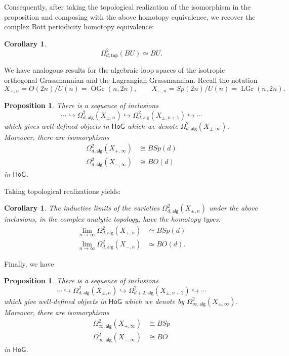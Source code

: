 \message{ !name(Bryan-Vakil.tex)}\documentclass{amsart}
\newtheorem{proposition}[theorem]{Proposition}
\newtheorem{corollary}[theorem]{Corollary}
\theoremstyle{definition}
\newcommand{\HoG}{\textsf{HoG}}
\newcommand{\alg}{\mathsf{alg}}
\renewcommand{\top}{\mathsf{top}}
\newcommand{\LGr}{\operatorname{LGr}}
\newcommand{\OGr}{\operatorname{OGr}}
\newcommand{\LoopTwo}{\Omega^{2}_{d,\alg}}
\newcommand{\LoopTwoTop}{\Omega^{2}_{d,\top}}
\newcommand{\homotopyeq}{\simeq}
\begin{document}
Consequently, after taking the topological realization of the
isomorphism in the proposition and composing with the above homotopy
equivalence, we recover the complex Bott periodicity homotopy
equivalence:

\begin{corollary}
\[
\LoopTwoTop (BU)\homotopyeq BU.
\]
\end{corollary}

We have analogous results for the algebraic loop spaces of the
isotropic orthogonal Grassmannian and the Lagrangian
Grassmannian. Recall the notation
\[
X_{+,n} =  O(2n)/U(n) = \OGr (n,2n),\quad  \quad X_{-,n} = Sp(2n)/U(n)=\LGr (n,2n).
\]

\begin{proposition}\label{prop: Loop2(X+,inrty)=BSp(d) in HoG and same
for X-}
There is a sequence of inclusions
\[
\dotsb \hookrightarrow \LoopTwo (X_{\pm ,n})  \hookrightarrow \LoopTwo
(X_{\pm ,n+1}) \hookrightarrow \dotsb 
\]
which gives well-defined objects in $\HoG$ which we denote $\LoopTwo
(X_{\pm,\infty })$. Moreover, there are isomorphisms
\begin{align*}
\LoopTwo (X_{+,\infty})&\cong BSp(d)\\
\LoopTwo (X_{-,\infty})&\cong BO(d)
\end{align*}
in $\HoG$. 
\end{proposition}
Taking topological realizations yields:
\begin{corollary}
The inductive limits of the varieties $\LoopTwo (X_{\pm ,n})$ under
the above inclusions, in the complex analytic topology, have the
homotopy types:
\begin{align*}
\lim_{n\to \infty }\LoopTwo (X_{+,n})&\homotopyeq  BSp(d)\\
\lim_{n\to \infty }\LoopTwo (X_{-,n})&\homotopyeq  BO(d).
\end{align*}
\end{corollary}

Finally, we have
\begin{proposition}\label{prop: Loop2inftyX+=BSp in HoG and similar for X-}
There is a sequence of inclusions
\[
\dotsb \hookrightarrow \LoopTwo (X_{\pm ,n})
\hookrightarrow \Omega^{2}_{d+2,\alg} (X_{\pm ,n+2}) \hookrightarrow \dotsb 
\]
which give well-defined objects in $\HoG$ which we denote by
$\Omega^{2}_{\infty ,\alg}(X_{\pm ,\infty})$. Moreover, there are
isomorphisms
\begin{align*}
\Omega^{2}_{\infty ,\alg}(X_{+,\infty})&\cong BSp\\
\Omega^{2}_{\infty ,\alg}(X_{-,\infty})&\cong BO
\end{align*}
in $\HoG$.
\end{proposition}
\end{document}

